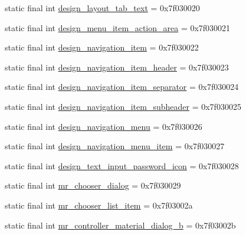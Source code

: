 \begin{CompactItemize}
\item 
static final int \hyperlink{classandroid_1_1support_1_1graphics_1_1drawable_1_1_r_1_1layout_574bceaa68e4f3c57627ec5a4b663854}{design\_\-layout\_\-tab\_\-text} = 0x7f030020
\item 
static final int \hyperlink{classandroid_1_1support_1_1graphics_1_1drawable_1_1_r_1_1layout_d1b501607992cdaa96a2d36870b7b483}{design\_\-menu\_\-item\_\-action\_\-area} = 0x7f030021
\item 
static final int \hyperlink{classandroid_1_1support_1_1graphics_1_1drawable_1_1_r_1_1layout_6f4045f383848e03753bdb7d84e70642}{design\_\-navigation\_\-item} = 0x7f030022
\item 
static final int \hyperlink{classandroid_1_1support_1_1graphics_1_1drawable_1_1_r_1_1layout_dc6d462175ea0f90e169f60cb918c453}{design\_\-navigation\_\-item\_\-header} = 0x7f030023
\item 
static final int \hyperlink{classandroid_1_1support_1_1graphics_1_1drawable_1_1_r_1_1layout_a41acf54650881dbd090c5ef9b06e579}{design\_\-navigation\_\-item\_\-separator} = 0x7f030024
\item 
static final int \hyperlink{classandroid_1_1support_1_1graphics_1_1drawable_1_1_r_1_1layout_29e01737a29e9ff2b4dbd5bc01e797c3}{design\_\-navigation\_\-item\_\-subheader} = 0x7f030025
\item 
static final int \hyperlink{classandroid_1_1support_1_1graphics_1_1drawable_1_1_r_1_1layout_b68133b417d9aeccc7c9015e86e42a84}{design\_\-navigation\_\-menu} = 0x7f030026
\item 
static final int \hyperlink{classandroid_1_1support_1_1graphics_1_1drawable_1_1_r_1_1layout_1bc518290588b39ff38a5601f21174f5}{design\_\-navigation\_\-menu\_\-item} = 0x7f030027
\item 
static final int \hyperlink{classandroid_1_1support_1_1graphics_1_1drawable_1_1_r_1_1layout_a00fd6bb30abbe794bc6bf849196f0ec}{design\_\-text\_\-input\_\-password\_\-icon} = 0x7f030028
\item 
static final int \hyperlink{classandroid_1_1support_1_1graphics_1_1drawable_1_1_r_1_1layout_c3b48efb38239ea2c39c4e0fe24341b1}{mr\_\-chooser\_\-dialog} = 0x7f030029
\item 
static final int \hyperlink{classandroid_1_1support_1_1graphics_1_1drawable_1_1_r_1_1layout_bfe17e481e23112ef53c67072d2df74b}{mr\_\-chooser\_\-list\_\-item} = 0x7f03002a
\item 
static final int \hyperlink{classandroid_1_1support_1_1graphics_1_1drawable_1_1_r_1_1layout_a4fb33a6d4cd06dcbb2873fad06ae548}{mr\_\-controller\_\-material\_\-dialog\_\-b} = 0x7f03002b

\end{CompactItemize}
